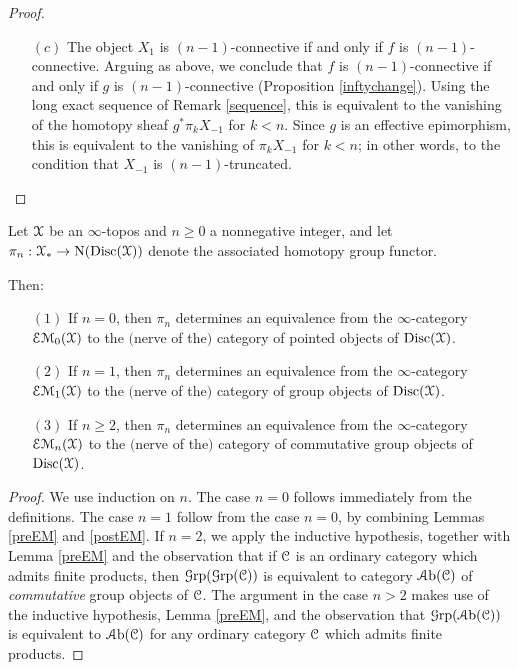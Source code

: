\begin{proof}
\begin{itemize}
\item[$(c)$] The object $X_{1}$ is $(n-1)$-connective if and only if
$f$ is $(n-1)$-connective. Arguing as above, we conclude that $f$ is $(n-1)$-connective if and only if $g$ is $(n-1)$-connective (Proposition \ref{inftychange}). Using the long exact sequence of Remark \ref{sequence}, this is equivalent to the vanishing of the homotopy sheaf $g^{\ast} \pi_k X_{-1}$ for $k < n$. Since $g$ is an effective epimorphism, this is equivalent to the vanishing of $\pi_k X_{-1}$ for $k < n$; in other words, to the condition that $X_{-1}$ is $(n-1)$-truncated.
\end{itemize}

\end{proof}

\begin{proposition}\label{EM}
Let $\operatorname{\mathcal{X}}$ be an $\infty$-topos and $n \geq 0$ a nonnegative integer, and let 
$\pi_n: \operatorname{\mathcal{X}}_{\ast} \rightarrow \operatorname{N}(\operatorname{Disc}(\operatorname{\mathcal{X}}))$ denote the associated homotopy group functor.

Then:
\begin{itemize}
\item[$(1)$] If $n = 0$, then $\pi_n$ determines an equivalence from the $\infty$-category $\operatorname{\mathcal{E}\mathcal{M}}_{0}(\operatorname{\mathcal{X}})$ to the $($nerve of the$)$ category of pointed objects of $\operatorname{Disc}(\operatorname{\mathcal{X}})$.
\item[$(2)$] If $n = 1$, then $\pi_n$ determines an equivalence from the $\infty$-category $\operatorname{\mathcal{E}\mathcal{M}}_{1}(\operatorname{\mathcal{X}})$ to the $($nerve of the$)$ category of group objects of $\operatorname{Disc}(\operatorname{\mathcal{X}})$.
\item[$(3)$] If $n \geq 2$, then $\pi_n$ determines an equivalence from the $\infty$-category $\operatorname{\mathcal{E}\mathcal{M}}_{n}(\operatorname{\mathcal{X}})$ to the $($nerve of the$)$ category of commutative group objects of $\operatorname{Disc}(\operatorname{\mathcal{X}})$.
\end{itemize}
\end{proposition}

\begin{proof}
We use induction on $n$. The case $n=0$ follows immediately from the definitions. The
case $n=1$ follow from the case $n=0$, by combining Lemmas \ref{preEM} and \ref{postEM}.
If $n=2$, we apply the inductive hypothesis, together with Lemma \ref{preEM} and the observation
that if $\operatorname{\mathcal{C}}$ is an ordinary category which admits finite products, then $\operatorname{\mathcal{G}rp}( \operatorname{\mathcal{G}rp}(\operatorname{\mathcal{C}}))$ is equivalent to category $\operatorname{\mathcal{A}b}(\operatorname{\mathcal{C}})$ of {\em commutative} group objects of $\operatorname{\mathcal{C}}$. The argument
in the case $n > 2$ makes use of the inductive hypothesis, Lemma \ref{preEM}, and the observation that $\operatorname{\mathcal{G}rp}( \operatorname{\mathcal{A}b}(\operatorname{\mathcal{C}}) )$ is equivalent to $\operatorname{\mathcal{A}b}(\operatorname{\mathcal{C}})$ for any ordinary category $\operatorname{\mathcal{C}}$ which admits finite products.
\end{proof}


